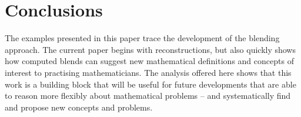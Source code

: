 \section{Conclusions}
\label{sec:conc}

The examples presented in this paper trace the development of the
blending approach.
The current paper begins with reconstructions, but also
quickly shows how computed blends can suggest new mathematical
definitions and concepts of interest to practising mathematicians.
The analysis offered here shows that this work is a building block that
will be useful for future developments that are able to reason more
flexibly about mathematical problems -- and systematically find and
propose new concepts and problems.

